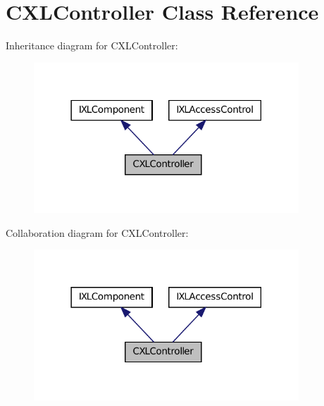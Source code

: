 \hypertarget{classCXLController}{
\section{CXLController Class Reference}
\label{classCXLController}
}


Inheritance diagram for CXLController:\nopagebreak
\begin{figure}[H]
\begin{center}
\leavevmode
\includegraphics[width=282pt]{classCXLController__inherit__graph}
\end{center}
\end{figure}


Collaboration diagram for CXLController:\nopagebreak
\begin{figure}[H]
\begin{center}
\leavevmode
\includegraphics[width=282pt]{classCXLController__coll__graph}
\end{center}
\end{figure}

